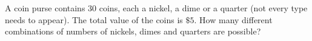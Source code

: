 A coin purse contains $30$ coins, each a nickel, a dime or a quarter (not every type needs to appear). The total value of the coins is $\$5$. How many different combinations of numbers of nickels, dimes and quarters are possible?
